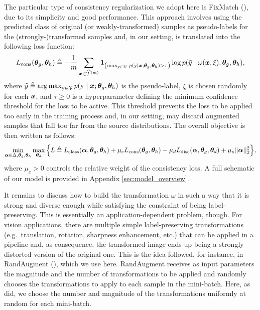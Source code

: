 The particular type of consistency regularization we adopt here is FixMatch (\citet{Sohn2020}), due to its simplicity and good performance. This approach involves using the predicted class of original (or weakly-transformed) samples as pseudo-labels for the (strongly-)transformed samples and, in our setting, is translated into the following loss function:
\begin{equation}
	\label{eq:consistency_loss}
    L_{\text{cons}}({\bm{\theta}}_g, {\bm{\theta}}_h) \triangleq -\frac{1}{m}\sum_{{\bm{x}} \in \widehat{{\mathcal{T}}}^{(m)}} \bm{1}_{\left(\max_{{\textnormal{y}} \in {\mathcal{Y}}}\, p({\textnormal{y}} \mid {\bm{x}}; {\bm{\theta}}_g, {\bm{\theta}}_h) > \tau \right)} \log p(\tilde{y} \mid \omega({\bm{x}}, \xi); {\bm{\theta}}_g, {\bm{\theta}}_h),
\end{equation}
where $\tilde{y} \triangleq \operatorname*{arg\,max}_{{\textnormal{y}} \in {\mathcal{Y}}} p({\textnormal{y}} \mid {\bm{x}}; {\bm{\theta}}_g, {\bm{\theta}}_h)$ is the pseudo-label, $\xi$ is chosen randomly for each ${\bm{x}}$, and $\tau \geq 0$ is a hyperparameter defining the minimum confidence threshold for the loss to be active. This threshold prevents the loss to be applied too early in the training process and, in our setting, may discard augmented samples that fall too far from the source distributions. The overall objective is then written as follows:
\begin{equation}
	\label{eq:modafm_obj}
    \min_{{\bm{\alpha}} \in \Delta, {\bm{\theta}}_g, {\bm{\theta}}_h}\max_{{\bm{\theta}}_d} \Big\{ L \triangleq L_\text{class}({\bm{\alpha}}, {\bm{\theta}}_g, {\bm{\theta}}_h) + \mu_c L_\text{cons}({\bm{\theta}}_g, {\bm{\theta}}_h) - \mu_d L_\text{disc}({\bm{\alpha}}, {\bm{\theta}}_g, {\bm{\theta}}_d) + \mu_s ||{\bm{\alpha}}||_2^2 \Big\},
\end{equation}
where $\mu_c > 0$ controls the relative weight of the consistency loss. A full schematic of our model is provided in Appendix \ref{sec:model_overview}.

It remains to discuss how to build the transformation $\omega$ in such a way that it is strong and diverse enough while satisfying the constraint of being label-preserving. This is essentially an application-dependent problem, though. For vision applications, there are multiple simple label-preserving transformations (e.g.\ translation, rotation, sharpness enhancement, etc.) that can be applied in a pipeline and, as consequence, the transformed image ends up being a strongly distorted version of the original one. This is the idea followed, for instance, in RandAugment (\citet{Cubuk2019}), which we use here. RandAugment receives as input parameters the magnitude and the number of transformations to be applied and randomly chooses the transformations to apply to each sample in the mini-batch. Here, as \citet{Sohn2020} did, we choose the number and magnitude of the transformations uniformly at random for each mini-batch.


